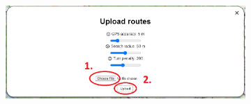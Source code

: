 \begin{figure}[H]
\begin{subfigure}{0.2\textwidth}
    \end{subfigure}
    \begin{subfigure}{0.78\textwidth}
        \centering
        \includegraphics[width=1\textwidth]{guide_includes/img/upload_file.png}
    \end{subfigure}
\end{figure}


